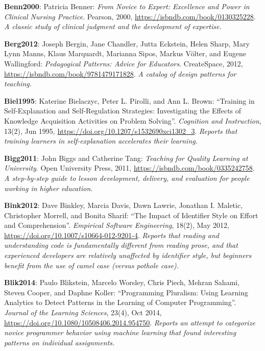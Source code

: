 \textbf{\hypertarget{b:Benn2000}{Benn2000}\label{b:Benn2000}}: Patricia Benner: \emph{From Novice to Expert: Excellence and Power in Clinical Nursing Practice}. Pearson, 2000, \url{https://isbndb.com/book/0130325228}. \emph{A classic study of clinical judgment and the development of expertise.}

\textbf{\hypertarget{b:Berg2012}{Berg2012}\label{b:Berg2012}}: Joseph Bergin, Jane Chandler, Jutta Eckstein, Helen Sharp, Mary Lynn Manns, Klaus Marquardt, Marianna Sipos, Markus Völter, and Eugene Wallingford: \emph{Pedagogical Patterns: Advice for Educators}. CreateSpace, 2012, \url{https://isbndb.com/book/9781479171828}. \emph{A catalog of design patterns for teaching.}

\textbf{\hypertarget{b:Biel1995}{Biel1995}\label{b:Biel1995}}: Katerine Bielaczyc, Peter L. Pirolli, and Ann L. Brown: ``Training in Self-Explanation and Self-Regulation Strategies: Investigating the Effects of Knowledge Acquisition Activities on Problem Solving''. \emph{Cognition and Instruction}, 13(2), Jun 1995, \url{https://doi.org/10.1207/s1532690xci1302_3}. \emph{Reports that training learners in self-explanation accelerates their learning.}

\textbf{\hypertarget{b:Bigg2011}{Bigg2011}\label{b:Bigg2011}}: John Biggs and Catherine Tang: \emph{Teaching for Quality Learning at University}. Open University Press, 2011, \url{https://isbndb.com/book/0335242758}. \emph{A step-by-step guide to lesson development, delivery, and evaluation for people working in higher education.}

\textbf{\hypertarget{b:Bink2012}{Bink2012}\label{b:Bink2012}}: Dave Binkley, Marcia Davis, Dawn Lawrie, Jonathan I. Maletic, Christopher Morrell, and Bonita Sharif: ``The Impact of Identifier Style on Effort and Comprehension''. \emph{Empirical Software Engineering}, 18(2), May 2012, \url{https://doi.org/10.1007/s10664-012-9201-4}. \emph{Reports that reading and understanding code is fundamentally different from reading prose, and that experienced developers are relatively unaffected by identifier style, but beginners benefit from the use of camel case (versus pothole case).}

\textbf{\hypertarget{b:Blik2014}{Blik2014}\label{b:Blik2014}}: Paulo Blikstein, Marcelo Worsley, Chris Piech, Mehran Sahami, Steven Cooper, and Daphne Koller: ``Programming Pluralism: Using Learning Analytics to Detect Patterns in the Learning of Computer Programming''. \emph{Journal of the Learning Sciences}, 23(4), Oct 2014, \url{https://doi.org/10.1080/10508406.2014.954750}. \emph{Reports an attempt to categorize novice programmer behavior using machine learning that found interesting patterns on individual assignments.}

